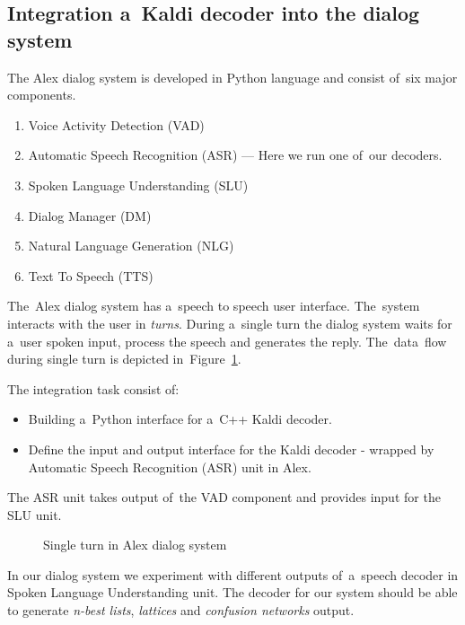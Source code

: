 \subsection{Integration a~Kaldi decoder into the dialog system} 
\label{sub:integration}
The Alex dialog system is developed in Python language and consist of~six major components. 
\begin{enumerate}
    \item Voice Activity Detection (VAD)
    \item Automatic Speech Recognition (ASR) --- Here we run one of~our decoders.
    \item Spoken Language Understanding (SLU)
    \item Dialog Manager (DM)
    \item Natural Language Generation (NLG)
    \item Text To Speech (TTS)
\end{enumerate}
The~Alex dialog system has a~speech to speech user interface. The~system interacts with the user in {\it turns}. During a~single turn the dialog system waits for a~user spoken input, process the speech and generates the reply.
The~data~flow during single turn is depicted in~Figure~\ref{fig:dialog_system}.

The integration task consist of:
\begin{itemize}
    \item Building a~Python interface for a~C++ Kaldi decoder.
    \item Define the input and output interface for the Kaldi decoder - wrapped by Automatic Speech Recognition (ASR) unit in Alex.
\end{itemize}
 The ASR unit takes output of~the VAD component and provides input for the SLU unit. 

\begin{figure}
    \begin{center}
    
    \caption{Single turn in Alex dialog system}
    \label{fig:dialog_system} 
    \end{center}
\end{figure}

In our dialog system we experiment with different outputs of~a~speech decoder in Spoken Language Understanding unit. 
The decoder for our system should be able to generate {\it n-best lists}, {\it lattices} and {\it confusion networks} output.

